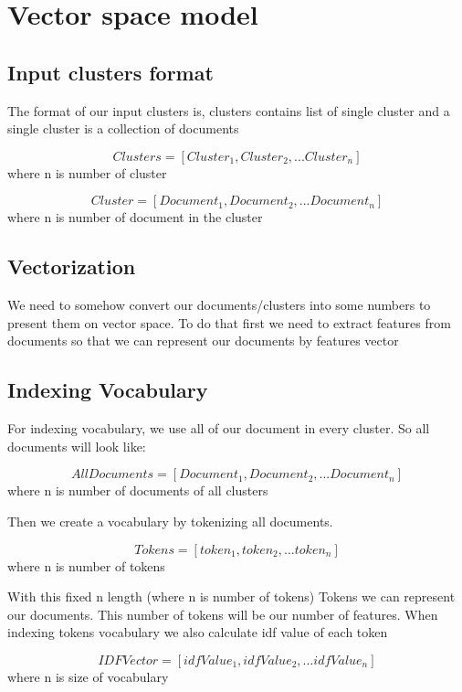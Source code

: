 \documentclass[a4paper]{article}
\begin{document}
\section{Vector space model}

\subsection{Input clusters format}

The format of our input clusters is, clusters contains list of single cluster and a single cluster is a collection of documents

$$Clusters = [Cluster_1, Cluster_2, ... Cluster_n]$$
where n is number of cluster

$$Cluster = [Document_1, Document_2, ... Document_n]$$
where n is number of document in the cluster

\subsection{Vectorization}

We need to somehow convert our documents/clusters into some numbers to present them on vector space. To do that first we need to extract features from documents so that we can represent our documents by features vector

\subsection{Indexing Vocabulary}

For indexing vocabulary, we use all of our document in every cluster. So all documents will look like:

$$AllDocuments = [Document_1, Document_2, ... Document_n]$$
where n is number of documents of all clusters

Then we create a vocabulary by tokenizing all documents.

$$Tokens = [token_1, token_2, ... token_n]$$
where n is number of tokens

With this fixed n length (where n is number of tokens) Tokens we can represent our documents. This number of tokens will be our number of features. When indexing tokens vocabulary we also calculate idf value of each token

$$IDFVector = [idfValue_1, idfValue_2, ... idfValue_n]$$
where n is size of vocabulary
\end{document}

